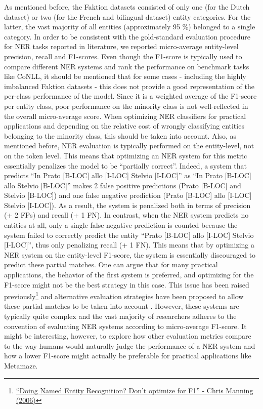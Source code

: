 \documentclass[12pt,a4paper,]{book}
\begin{document}
As mentioned before, the Faktion datasets consisted of only one (for the Dutch dataset) or two (for the French and bilingual dataset) entity categories. For the latter, the vast majority of all entities (approximately 95 \%) belonged to a single category. In order to be consistent with the gold-standard evaluation procedure for NER tasks reported in literature, we reported micro-average entity-level precision, recall and F1-scores. Even though the F1-score is typically used to compare different NER systems and rank the performance on benchmark tasks like CoNLL, it should be mentioned that for some cases - including the highly imbalanced Faktion datasets - this does not provide a good representation of the per-class performance of the model. Since it is a weighted average of the F1-score per entity class, poor performance on the minority class is not well-reflected in the overall micro-average score. When optimizing NER classifiers for practical applications and depending on the relative cost of wrongly classifying entities belonging to the minority class, this should be taken into account. Also, as mentioned before, NER evaluation is typically performed on the entity-level, not on the token level. This means that optimizing an NER system for this metric essentially penalizes the model to be ``partially correct''. Indeed, a system that predicts ``In Prato {[}B-LOC{]} allo {[}I-LOC{]} Stelvio {[}I-LOC{]}'' as ``In Prato {[}B-LOC{]} allo Stelvio {[}B-LOC{]}'' makes 2 false positive predictions (Prato {[}B-LOC{]} and Stelvio {[}B-LOC{]}) and one false negative prediction (Prato {[}B-LOC{]} allo {[}I-LOC{]} Stelvio {[}I-LOC{]}). As a result, the system is penalized both in terms of precision (+ 2 FPs) and recall (+ 1 FN). In contrast, when the NER system predicts no entities at all, only a single false negative prediction is counted because the system failed to correctly predict the entity ``Prato {[}B-LOC{]} allo {[}I-LOC{]} Stelvio {[}I-LOC{]}'', thus only penalizing recall (+ 1 FN). This means that by optimizing a NER system on the entity-level F1-score, the system is essentially discouraged to predict these partial matches. One can argue that for many practical applications, the behavior of the first system is preferred, and optimizing for the F1-score might not be the best strategy in this case. This issue has been raised previously\footnote{\href{https://nlpers.blogspot.com/2006/08/doing-named-entity-recognition-dont.html}{``Doing Named Entity Recognition? Don't optimize for F1'' - Chris Manning (2006)}} and alternative evaluation strategies have been proposed to allow these partial matches to be taken into account \citep{chinchor1993, doddington2004, esuli2010}. However, these systems are typically quite complex and the vast majority of researchers adheres to the convention of evaluating NER systems according to micro-average F1-score. It might be interesting, however, to explore how other evaluation metrics compare to the way humans would naturally judge the performance of a NER system and how a lower F1-score might actually be preferable for practical applications like Metamaze.
\end{document}
